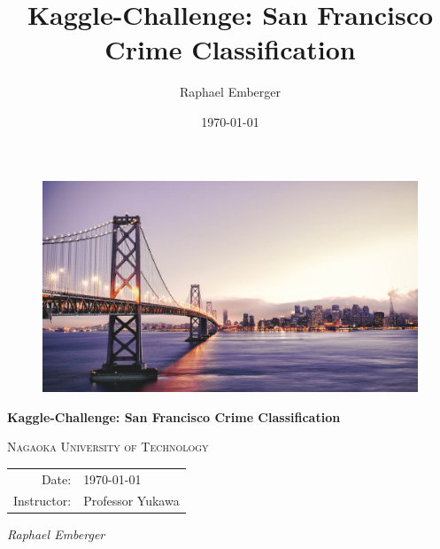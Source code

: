\documentclass[12pt,a4paper]{scrartcl}
\author{Raphael Emberger}
\title{Kaggle-Challenge: San Francisco Crime Classification}
\date{\today}
\begin{document}
\begin{titlepage}
\centering
\begin{figure}[htbp]\label{f:san_francisco}
\includegraphics[width=\textwidth]{San-Francisco}\par\vspace{1cm}
\caption{\cite{sf_pic}}
\end{figure}
{\huge\bfseries Kaggle-Challenge: San Francisco Crime Classification\par}
\vspace{1.5cm}
{\scshape\LARGE Nagaoka University of Technology \par}
\vspace{2cm}
\begin{center}
\begin{tabular}{r l}
Date: & \today\\
Instructor: & Professor Yukawa
\end{tabular}
\end{center}
\vfill
{\Large\itshape Raphael Emberger\par}
\vfill
\end{titlepage}

\tableofcontents
\pagebreak
\end{document}
